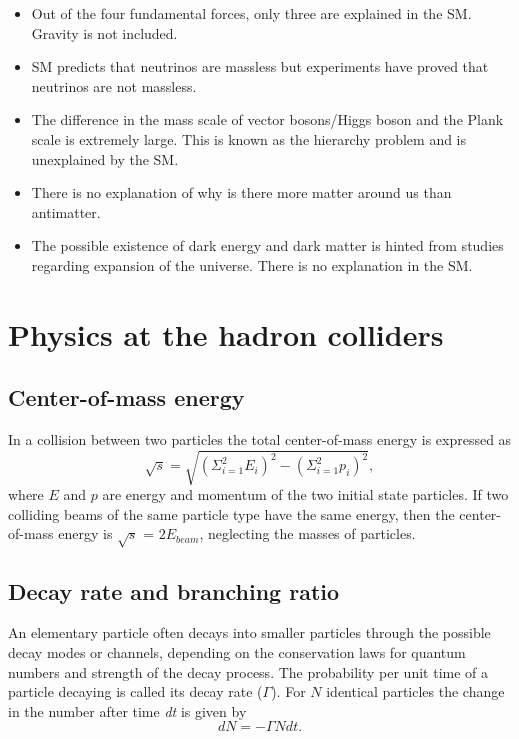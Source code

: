 \begin{itemize}
    \item Out of the four fundamental forces, only three are explained in the SM. Gravity is not included.
    \item SM predicts that neutrinos are massless but experiments have proved that neutrinos are not massless.
    \item The difference in the mass scale of vector bosons/Higgs boson and the Plank scale is extremely 
    large. This is known as the hierarchy problem and is unexplained by the SM.
    \item There is no explanation of why is there more matter around us than antimatter.
    \item The possible existence of dark energy and dark matter is hinted from studies regarding
    expansion of the universe. There is no explanation in the SM. 
\end{itemize}

\section{Physics at the hadron colliders}


\subsection*{Center-of-mass energy}
In a collision between two particles the total center-of-mass energy is expressed as
\begin{equation}
    \sqrt{s} = \sqrt{(\Sigma_{i = 1}^{2} E_i)^2 - (\Sigma_{i = 1}^{2} p_i)^2},
\end{equation}
where $E$ and $p$ are energy and momentum of the two initial state particles. If two colliding beams 
of the same particle type have the same energy, then the center-of-mass energy is 
$\sqrt{s}$ = $2E_{beam}$, neglecting the masses of particles. 

\subsection*{Decay rate and branching ratio}

An elementary particle often decays into smaller particles through the possible decay modes or 
channels, depending on the conservation laws for quantum numbers and strength of the decay process. 
The probability per unit time of a particle decaying is called its decay rate ($\Gamma$). For $N$ 
identical particles the change in the number after time \textit{dt} is given by
\begin{equation}
    dN = - \Gamma N dt.
\end{equation}

